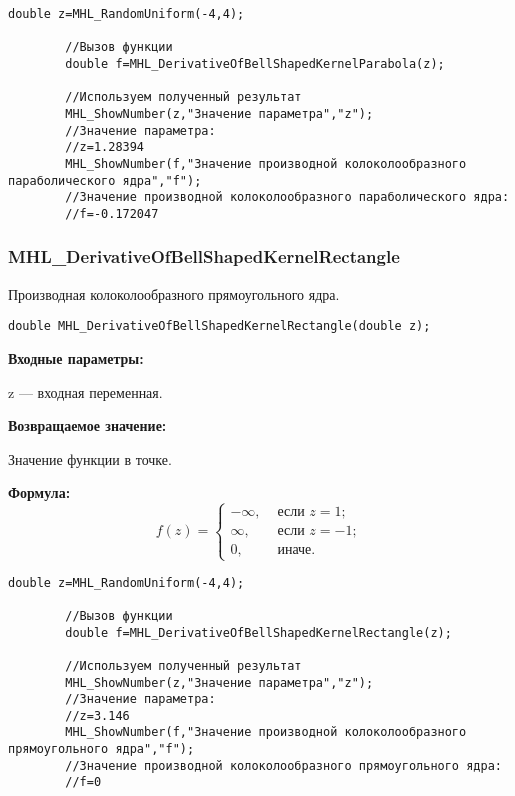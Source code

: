 \documentclass[a4paper,12pt]{article}
\begin{document}
\begin{lstlisting}[label=code_use_MHL_DerivativeOfBellShapedKernelParabola,caption=Пример использования]
        double z=MHL_RandomUniform(-4,4);

        //Вызов функции
        double f=MHL_DerivativeOfBellShapedKernelParabola(z);

        //Используем полученный результат
        MHL_ShowNumber(z,"Значение параметра","z");
        //Значение параметра:
        //z=1.28394
        MHL_ShowNumber(f,"Значение производной колоколообразного параболического ядра","f");
        //Значение производной колоколообразного параболического ядра:
        //f=-0.172047
\end{lstlisting}

\subsubsection{MHL\_DerivativeOfBellShapedKernelRectangle}\label{MHL_DerivativeOfBellShapedKernelRectangle}

Производная колоколообразного прямоугольного ядра.


\begin{lstlisting}[label=code_syntax_MHL_DerivativeOfBellShapedKernelRectangle,caption=Синтаксис]
double MHL_DerivativeOfBellShapedKernelRectangle(double z);
\end{lstlisting}

\textbf{Входные параметры:}
 
z --- входная переменная.

\textbf{Возвращаемое значение:}
 
Значение функции в точке.

\textbf{Формула:}
\begin{equation*}
f\left(z \right)=\left\lbrace \begin{aligned} -\infty,& \text{ если } z = 1 ; \\\infty,& \text{ если } z = -1 ; \\ 0,& \text{ иначе}. \end{aligned}\right.
\end{equation*}


\begin{lstlisting}[label=code_use_MHL_DerivativeOfBellShapedKernelRectangle,caption=Пример использования]
        double z=MHL_RandomUniform(-4,4);

        //Вызов функции
        double f=MHL_DerivativeOfBellShapedKernelRectangle(z);

        //Используем полученный результат
        MHL_ShowNumber(z,"Значение параметра","z");
        //Значение параметра:
        //z=3.146
        MHL_ShowNumber(f,"Значение производной колоколообразного прямоугольного ядра","f");
        //Значение производной колоколообразного прямоугольного ядра:
        //f=0
\end{lstlisting}
\end{document}
